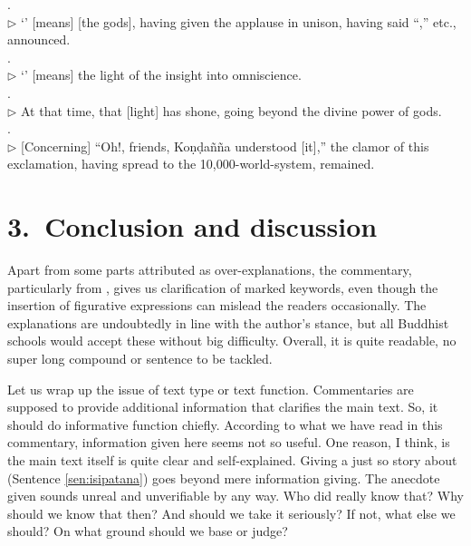 . \\
$\triangleright$ `' [means] [the gods], having given the applause in unison, having said ``,'' etc., announced.\\

. \\
$\triangleright$ `' [means] the light of the insight into omniscience.\\

. \\
$\triangleright$ At that time, that [light] has shone, going beyond the divine power of gods.\\

. \\
$\triangleright$ [Concerning] ``Oh!, friends, Ko\d n\d da\~n\~na understood [it],'' the clamor of this exclamation, having spread to the 10,000-world-system, remained.\\

{}
\section*{3.\ Conclusion and discussion}

Apart from some parts attributed as over-explanations, the commentary, particularly from , gives us clarification of marked keywords, even though the insertion of figurative expressions can mislead the readers occasionally. The explanations are undoubtedly in line with the author's stance, but all Buddhist schools would accept these without big difficulty. Overall, it is quite readable, no super long compound or sentence to be tackled.

Let us wrap up the issue of text type or text function. Commentaries are supposed to provide additional information that clarifies the main text. So, it should do informative function chiefly. According to what we have read in this commentary, information given here seems not so useful. One reason, I think, is the main text itself is quite clear and self-explained. Giving a just so story about  (Sentence \ref{sen:isipatana}) goes beyond mere information giving. The anecdote given sounds unreal and unverifiable by any way. Who did really know that? Why should we know that then? And should we take it seriously? If not, what else we should? On what ground should we base or judge?

